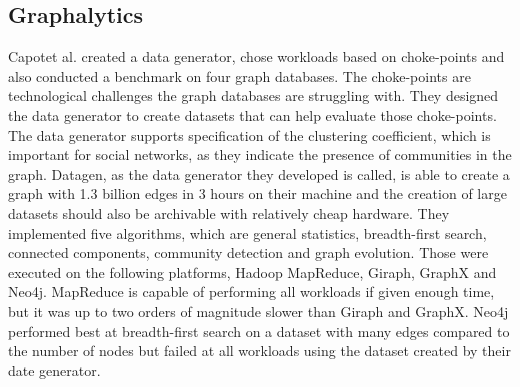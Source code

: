 \subsection{Graphalytics}
Capot\ua et al. created a data generator, chose workloads based on choke-points and also conducted a benchmark on four graph databases.
The choke-points are technological challenges the graph databases are struggling with.
They designed the data generator to create datasets that can help evaluate those choke-points.
The data generator supports specification of the clustering coefficient,
which is important for social networks,
as they indicate the presence of communities in the graph.
Datagen, as the data generator they developed is called,
is able to create a graph with 1.3 billion edges in 3 hours on their machine and the creation of large datasets should also be archivable with relatively cheap hardware.
They implemented five algorithms,
which are general statistics, breadth-first search, connected components, community detection and graph evolution.
Those were executed on the following platforms,
Hadoop MapReduce, Giraph, GraphX and Neo4j.
MapReduce is capable of performing all workloads if given enough time,
but it was up to two orders of magnitude slower than Giraph and GraphX.
Neo4j performed best at breadth-first search on a dataset with many edges compared to the number of nodes but failed at all workloads using the dataset created by their date generator.\cite{Capota2015}
